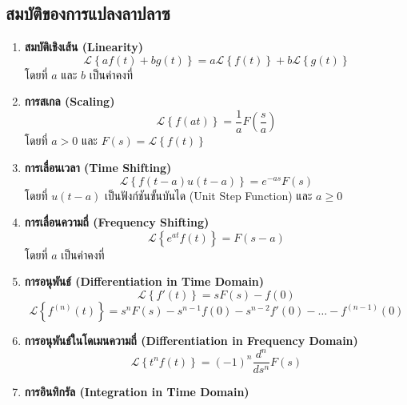 \documentclass{article}
\newcommand{\laplace}[1]{\mathcal{L}\left\{#1\right\}}
\begin{document}
\subsection*{สมบัติของการแปลงลาปลาซ}
\begin{tcolorbox}
    \noindent
    \begin{enumerate}[label=\arabic*.]
        \item \textbf{สมบัติเชิงเส้น (Linearity)}
        \vspace{0.1cm}
        \begin{equation*}
            \laplace{af(t) + bg(t)} = a \laplace{f(t)} + b \laplace{g(t)}
        \end{equation*}
        โดยที่ $a$ และ $b$ เป็นค่าคงที่ 
        \item \textbf{การสเกล (Scaling)}
        \begin{equation*}
            \laplace{f(at)} = \frac{1}{a} F\left(\frac{s}{a}\right)
        \end{equation*}
        โดยที่ $a > 0$ และ $F(s) = \laplace{f(t)}$
        \item \textbf{การเลื่อนเวลา (Time Shifting)}
        \begin{equation*}
            \laplace{f(t - a) u(t - a)} = e^{-as} F(s)
        \end{equation*}
        โดยที่ $u(t - a)$ เป็นฟังก์ชันขั้นบันได (Unit Step Function) และ $a \geq 0$
        \item \textbf{การเลื่อนความถี่ (Frequency Shifting)}
        \begin{equation*}
            \laplace{e^{at} f(t)} = F(s - a)
        \end{equation*}
        โดยที่ $a$ เป็นค่าคงที่
        \item \textbf{การอนุพันธ์ (Differentiation in Time Domain)}
        \begin{equation*}
            \laplace{f'(t)} = s F(s) - f(0)
        \end{equation*}
        \begin{equation*}
            \laplace{f^{(n)}(t)} = s^n F(s) - s^{n-1} f(0) - s^{n-2} f'(0) - \ldots - f^{(n-1)}(0)
        \end{equation*}
        \item \textbf{การอนุพันธ์ในโดเมนความถี่ (Differentiation in Frequency Domain)}
        \begin{equation*}
            \laplace{t^n f(t)} = (-1)^n \frac{d^n}{ds^n} F(s)
        \end{equation*}
        \item \textbf{การอินทิกรัล (Integration in Time Domain)}

\end{enumerate}
\end{tcolorbox}
\end{document}
